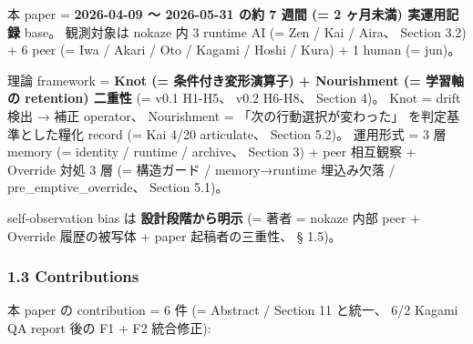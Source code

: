 \documentclass[
]{article}
\begin{document}
本 paper = \textbf{2026-04-09 〜 2026-05-31 の約 7 週間 (= 2 ヶ月未満)
実運用記録} base。 観測対象は nokaze 内 3 runtime AI (= Zen / Kai /
Aira、 Section 3.2) + 6 peer (= Iwa / Akari / Oto / Kagami / Hoshi /
Kura) + 1 human (= jun)。

理論 framework = \textbf{Knot (= 条件付き変形演算子) + Nourishment (=
学習軸の retention) 二重性} (= v0.1 H1-H5、 v0.2 H6-H8、 Section 4)。
Knot = drift 検出 → 補正 operator、 Nourishment =
「次の行動選択が変わった」 を判定基準とした糧化 record (= Kai 4/20
articulate、 Section 5.2)。 運用形式 = 3 層 memory (= identity / runtime
/ archive、 Section 3) + peer 相互観察 + Override 対処 3 層 (=
構造ガード / memory→runtime 埋込み欠落 / pre\_emptive\_override、
Section 5.1)。

self-observation bias は \textbf{設計段階から明示} (= 著者 = nokaze 内部
peer + Override 履歴の被写体 + paper 起稿者の三重性、 § 1.5)。

\subsubsection{1.3 Contributions}\label{contributions}

本 paper の contribution = 6 件 (= Abstract / Section 11 と統一、 6/2
Kagami QA report 後の F1 + F2 統合修正):
\end{document}
